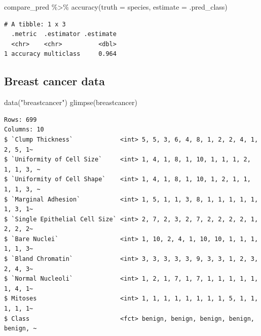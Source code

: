 \documentclass[
  letterpaper,
  DIV=11,
  numbers=noendperiod]{scrreprt}
\newenvironment{Shaded}{\begin{snugshade}}{\end{snugshade}}
\newcommand{\AttributeTok}[1]{\textcolor[rgb]{0.40,0.45,0.13}{#1}}
\newcommand{\FunctionTok}[1]{\textcolor[rgb]{0.28,0.35,0.67}{#1}}
\newcommand{\NormalTok}[1]{\textcolor[rgb]{0.00,0.23,0.31}{#1}}
\newcommand{\SpecialCharTok}[1]{\textcolor[rgb]{0.37,0.37,0.37}{#1}}
\newcommand{\StringTok}[1]{\textcolor[rgb]{0.13,0.47,0.30}{#1}}
\begin{document}
\begin{Shaded}
\begin{Highlighting}[]
\NormalTok{compare\_pred }\SpecialCharTok{\%\textgreater{}\%}  \FunctionTok{accuracy}\NormalTok{(}\AttributeTok{truth =}\NormalTok{ species, }\AttributeTok{estimate =}\NormalTok{ .pred\_class)}
\end{Highlighting}
\end{Shaded}

\begin{verbatim}
# A tibble: 1 x 3
  .metric  .estimator .estimate
  <chr>    <chr>          <dbl>
1 accuracy multiclass     0.964
\end{verbatim}

\hypertarget{breast-cancer-data}{%
\subsection{Breast cancer data}\label{breast-cancer-data}}

\begin{Shaded}
\begin{Highlighting}[]
\FunctionTok{data}\NormalTok{(}\StringTok{"breastcancer"}\NormalTok{)}
\FunctionTok{glimpse}\NormalTok{(breastcancer)}
\end{Highlighting}
\end{Shaded}

\begin{verbatim}
Rows: 699
Columns: 10
$ `Clump Thickness`             <int> 5, 5, 3, 6, 4, 8, 1, 2, 2, 4, 1, 2, 5, 1~
$ `Uniformity of Cell Size`     <int> 1, 4, 1, 8, 1, 10, 1, 1, 1, 2, 1, 1, 3, ~
$ `Uniformity of Cell Shape`    <int> 1, 4, 1, 8, 1, 10, 1, 2, 1, 1, 1, 1, 3, ~
$ `Marginal Adhesion`           <int> 1, 5, 1, 1, 3, 8, 1, 1, 1, 1, 1, 1, 3, 1~
$ `Single Epithelial Cell Size` <int> 2, 7, 2, 3, 2, 7, 2, 2, 2, 2, 1, 2, 2, 2~
$ `Bare Nuclei`                 <int> 1, 10, 2, 4, 1, 10, 10, 1, 1, 1, 1, 1, 3~
$ `Bland Chromatin`             <int> 3, 3, 3, 3, 3, 9, 3, 3, 1, 2, 3, 2, 4, 3~
$ `Normal Nucleoli`             <int> 1, 2, 1, 7, 1, 7, 1, 1, 1, 1, 1, 1, 4, 1~
$ Mitoses                       <int> 1, 1, 1, 1, 1, 1, 1, 1, 5, 1, 1, 1, 1, 1~
$ Class                         <fct> benign, benign, benign, benign, benign, ~
\end{verbatim}
\end{document}
